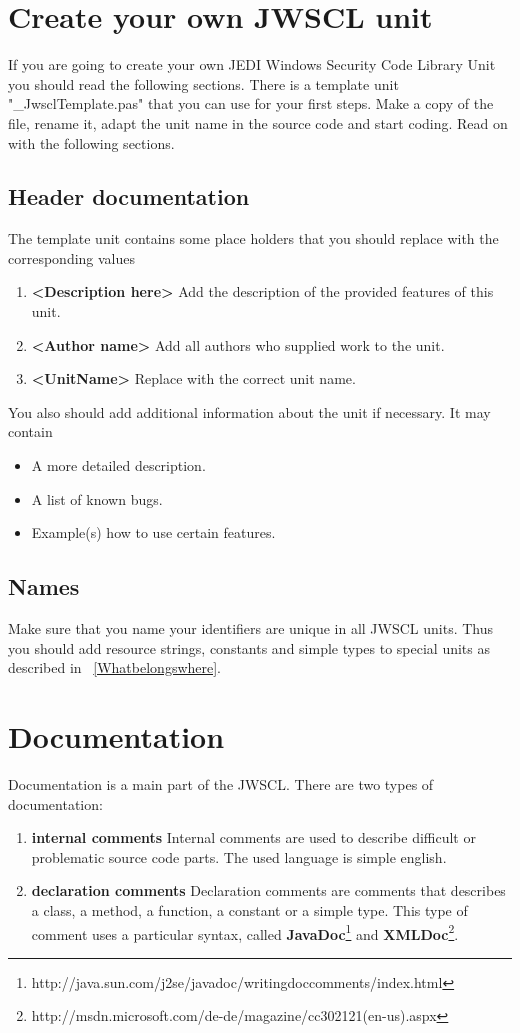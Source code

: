 \documentclass[a4paper,oneside,10pt]{article}
\begin{document}
\section{Create your own JWSCL unit}
If you are going to create your own JEDI Windows Security Code Library Unit you should read the following sections. There is a template unit "\_JwsclTemplate.pas" that you can use for your first steps. Make a copy of the file, rename it, adapt the unit name in the source code and start coding. Read on with the following sections.

\subsection{Header documentation}
The template unit contains some place holders that you should replace with the corresponding values
\begin{enumerate}
	\item \textbf{<Description here>} Add the description of the provided features of this unit.
  \item \textbf{<Author name>} Add all authors who supplied work to the unit.
  \item \textbf{<UnitName>} Replace with the correct unit name.
\end{enumerate}
You also should add additional information about the unit if necessary. It may contain
\begin{itemize}
  \item A more detailed description.
  \item A list of known bugs.
  \item Example(s) how to use certain features.  
\end{itemize}

\subsection{Names}
Make sure that you name your identifiers are unique in all JWSCL units. Thus you should add resource strings, constants and simple types to special units as described in ~\ref{Whatbelongswhere}.

\section{Documentation}
Documentation is a main part of the JWSCL. There are two types of documentation:
\begin{enumerate}
	\item \textbf{internal comments} Internal comments are used to describe difficult or problematic source code parts. 
The used language is simple english.
	\item \textbf{declaration comments} Declaration comments are comments that describes a class, a method, a function, a constant or a simple type. This type of comment uses a particular syntax, called \textbf{JavaDoc}\footnote{http://java.sun.com/j2se/javadoc/writingdoccomments/index.html} and \textbf{XMLDoc}\footnote{http://msdn.microsoft.com/de-de/magazine/cc302121(en-us).aspx}.
\end{enumerate}
\end{document}
